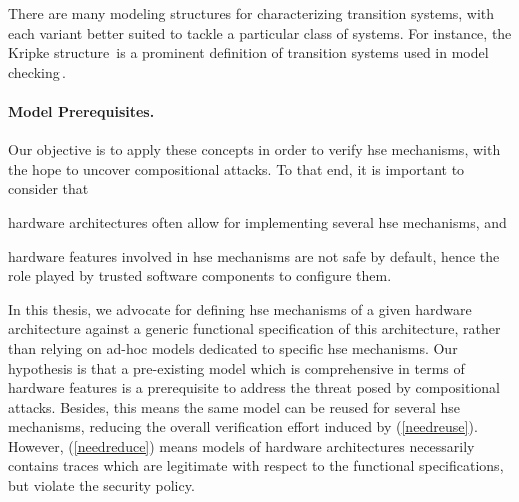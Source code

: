 There are many modeling structures for characterizing transition systems, with
each variant better suited to tackle a particular class of systems.
%
For instance, the Kripke structure\,\cite{kripke1971semantical} is a prominent
definition of transition systems used in model checking\,\cite{clarke1999model}.


\paragraph{Model Prerequisites.}
%
Our objective is to apply these concepts in order to verify \ac{hse} mechanisms,
with the hope to uncover compositional attacks.
%
To that end, it is important to consider that
%
\begin{inparaenum}[(1)]
\item \label{needreuse}%
  hardware architectures often allow for implementing several \ac{hse}
  mechanisms, and
\item \label{needreduce}%
  hardware features involved in \ac{hse} mechanisms are not safe by default,
  hence the role played by trusted software components to configure them.
\end{inparaenum}
%
In this thesis, we advocate for defining \ac{hse} mechanisms of a given hardware
architecture against a generic functional specification of this architecture,
rather than relying on ad-hoc models dedicated to specific \ac{hse} mechanisms.
%
Our hypothesis is that a pre-existing model which is comprehensive in terms of
hardware features is a prerequisite to address the threat posed by compositional
attacks.
%
Besides, this means the same model can be reused for several \ac{hse}
mechanisms, reducing the overall verification effort induced by
(\ref{needreuse}).
%
However, (\ref{needreduce}) means models of hardware architectures necessarily
contains traces which are legitimate with respect to the functional
specifications, but violate the security policy.

